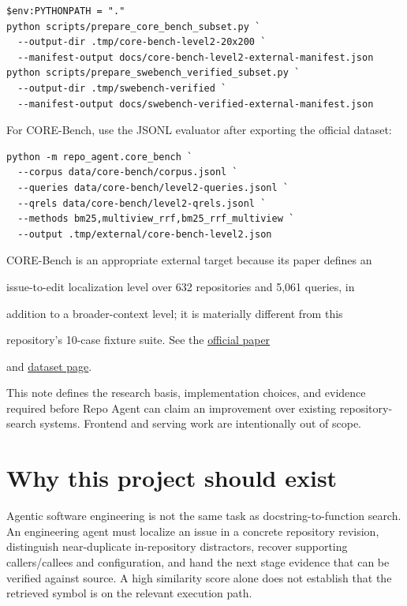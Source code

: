 \documentclass[UTF8,12pt,openany]{ctexbook}
\begin{document}
\begin{lstlisting}
$env:PYTHONPATH = "."
python scripts/prepare_core_bench_subset.py `
  --output-dir .tmp/core-bench-level2-20x200 `
  --manifest-output docs/core-bench-level2-external-manifest.json
python scripts/prepare_swebench_verified_subset.py `
  --output-dir .tmp/swebench-verified `
  --manifest-output docs/swebench-verified-external-manifest.json
\end{lstlisting}

For CORE-Bench, use the JSONL evaluator after exporting the official dataset:\par

\begin{lstlisting}
python -m repo_agent.core_bench `
  --corpus data/core-bench/corpus.jsonl `
  --queries data/core-bench/level2-queries.jsonl `
  --qrels data/core-bench/level2-qrels.jsonl `
  --methods bm25,multiview_rrf,bm25_rrf_multiview `
  --output .tmp/external/core-bench-level2.json
\end{lstlisting}

CORE-Bench is an appropriate external target because its paper defines an\par
issue-to-edit localization level over 632 repositories and 5,061 queries, in\par
addition to a broader-context level; it is materially different from this\par
repository's 10-case fixture suite. See the \href{https://arxiv.org/abs/2606.11864}{official paper}\par
and \href{https://huggingface.co/datasets/zhangfw123/CORE-Bench}{dataset page}.\par

This note defines the research basis, implementation choices, and evidence required before Repo Agent can claim an improvement over existing repository-search systems. Frontend and serving work are intentionally out of scope.\par

\section{Why this project should exist}

Agentic software engineering is not the same task as docstring-to-function search. An engineering agent must localize an issue in a concrete repository revision, distinguish near-duplicate in-repository distractors, recover supporting callers/callees and configuration, and hand the next stage evidence that can be verified against source. A high similarity score alone does not establish that the retrieved symbol is on the relevant execution path.\par
\end{document}
